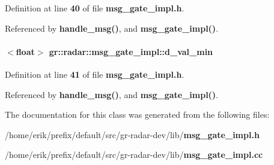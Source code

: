Definition at line {\bf 40} of file {\bf msg\+\_\+gate\+\_\+impl.\+h}.



Referenced by {\bf handle\+\_\+msg()}, and {\bf msg\+\_\+gate\+\_\+impl()}.

\paragraph[{d\+\_\+val\+\_\+min}]{$<$float$>$ gr\+::radar\+::msg\+\_\+gate\+\_\+impl\+::d\+\_\+val\+\_\+min}\label{classgr_1_1radar_1_1msg__gate__impl_aafe13e63a92a8a86920d5f2f2ffd7ef9}


Definition at line {\bf 41} of file {\bf msg\+\_\+gate\+\_\+impl.\+h}.



Referenced by {\bf handle\+\_\+msg()}, and {\bf msg\+\_\+gate\+\_\+impl()}.



The documentation for this class was generated from the following files\+:\begin{DoxyCompactItemize}
\item 
/home/erik/prefix/default/src/gr-\/radar-\/dev/lib/{\bf msg\+\_\+gate\+\_\+impl.\+h}\item 
/home/erik/prefix/default/src/gr-\/radar-\/dev/lib/{\bf msg\+\_\+gate\+\_\+impl.\+cc}\end{DoxyCompactItemize}
